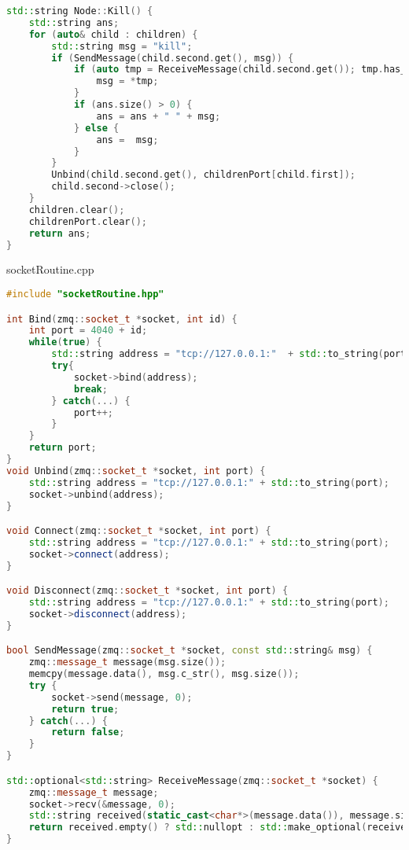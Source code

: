\documentclass[a4paper, 12pt]{article}
\begin{document}
\begin{lstlisting}[language=C++]
std::string Node::Kill() {
    std::string ans;
    for (auto& child : children) {
        std::string msg = "kill";
        if (SendMessage(child.second.get(), msg)) {
            if (auto tmp = ReceiveMessage(child.second.get()); tmp.has_value()) {
                msg = *tmp;
            }
            if (ans.size() > 0) {
                ans = ans + " " + msg;
            } else {
                ans =  msg;
            }
        }
        Unbind(child.second.get(), childrenPort[child.first]);
        child.second->close();
    }
    children.clear();
    childrenPort.clear();
    return ans;
}
\end{lstlisting}

socketRoutine.cpp
\begin{lstlisting}[language=C++]
#include "socketRoutine.hpp"

int Bind(zmq::socket_t *socket, int id) {
    int port = 4040 + id;
    while(true) {
        std::string address = "tcp://127.0.0.1:"  + std::to_string(port);
        try{
            socket->bind(address);
            break;
        } catch(...) {
            port++;
        }    
    }
    return port;
}
void Unbind(zmq::socket_t *socket, int port) {
    std::string address = "tcp://127.0.0.1:" + std::to_string(port);
    socket->unbind(address);
}

void Connect(zmq::socket_t *socket, int port) {
    std::string address = "tcp://127.0.0.1:" + std::to_string(port);
    socket->connect(address);
}

void Disconnect(zmq::socket_t *socket, int port) {
    std::string address = "tcp://127.0.0.1:" + std::to_string(port);
    socket->disconnect(address);
}

bool SendMessage(zmq::socket_t *socket, const std::string& msg) {
    zmq::message_t message(msg.size());
    memcpy(message.data(), msg.c_str(), msg.size());
    try {
        socket->send(message, 0);
        return true;
    } catch(...) {
        return false;
    }
}

std::optional<std::string> ReceiveMessage(zmq::socket_t *socket) {
    zmq::message_t message;
    socket->recv(&message, 0);
    std::string received(static_cast<char*>(message.data()), message.size());
    return received.empty() ? std::nullopt : std::make_optional(received);
}
\end{lstlisting}
\end{document}
